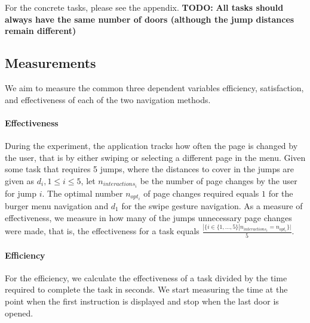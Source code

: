 \documentclass{sig-alternate-05-2015}
\newcommand{\todo}{\textbf{TODO:} \textbf}
\begin{document}
For the concrete tasks, please see the appendix. 
\todo{All tasks should always have the same number of doors (although the jump distances remain different)}
\subsection{Measurements}\label{chap:measurements}
\label{sec:measurements}
We aim to measure the common three dependent variables efficiency, satisfaction, and effectiveness of each of the two navigation methods.
\paragraph{Effectiveness}
During the experiment, the application tracks how often the page is changed by the user, that is by either swiping or selecting a different page in the menu. 
Given some task that requires 5 jumps, where the distances to cover in the jumps are given as $d_i, 1 \leq i \leq 5$, let $n_{interactions_i}$ be the number
of page changes by the user for jump $i$.
The optimal number $n_{opt_i}$ of
page changes required equals $1$ for the burger menu navigation and $d_1$ for the swipe gesture navigation. As a measure of 
effectiveness, we measure in how many of the jumps unnecessary page changes were made, that is, the effectiveness for a task
equals $\frac{|\{i \in \{1,\ldots,5\} | n_{interactions_i} = n_{opt_i} \}|}{5}$.
\paragraph{Efficiency} For the efficiency, we calculate the effectiveness of a task divided by the time 
required to complete the task in seconds. We start measuring the time at the point
when the first instruction is displayed and stop when the last door is opened.
\end{document}

